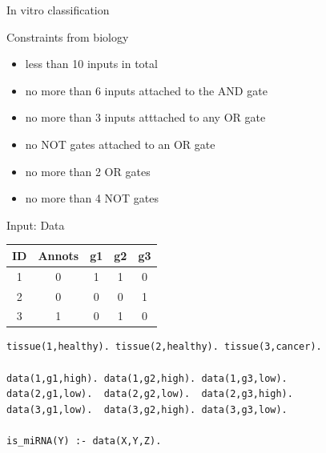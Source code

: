 \documentclass[10pt,dvipsnames]{beamer}
\begin{document}
\begin{frame}{In vitro classification}
\end{frame}


\begin{frame}{Constraints from biology}
\begin{itemize}
\item less than 10 inputs in total
\item no more than 6 inputs attached to the AND gate
\item no more than 3 inputs atttached to any OR gate
\item no NOT gates attached to an OR gate
\item no more than 2 OR gates
\item no more than 4 NOT gates
\end{itemize}
\end{frame}


\begin{frame}[fragile]{Input: Data}
\begin{center}
\begin{tabular}{|c|c|c|c|c|}
\hline
ID&	Annots&	g1&	g2&	g3\\
\hline
1&	0&	1&	1&	0\\
2&	0&	0&	0&	1\\
3&	1&	0&	1&	0\\
\hline
\end{tabular}
\end{center}
\vspace{0.2cm}
\begin{verbatim}
tissue(1,healthy). tissue(2,healthy). tissue(3,cancer).
 
data(1,g1,high). data(1,g2,high). data(1,g3,low).
data(2,g1,low).  data(2,g2,low).  data(2,g3,high).
data(3,g1,low).  data(3,g2,high). data(3,g3,low).
 
is_miRNA(Y) :- data(X,Y,Z).
\end{verbatim}
\end{frame}
\end{document}
